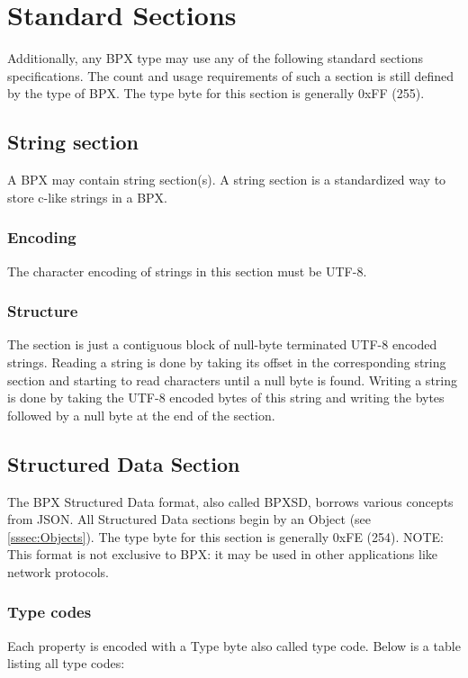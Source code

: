 \section{Standard Sections}

Additionally, any BPX type may use any of the following standard sections specifications. The count and usage requirements of such a section is still defined by the type of BPX. The type byte for this section is generally 0xFF (255).

\subsection{String section} \label{ssec:Strings}
A BPX may contain string section(s). A string section is a standardized way to store c-like strings in a BPX.

\subsubsection{Encoding}
The character encoding of strings in this section must be UTF-8.

\subsubsection{Structure}
The section is just a contiguous block of null-byte terminated UTF-8 encoded strings.\newline
Reading a string is done by taking its offset in the corresponding string section and starting to read characters until a null byte is found.\newline
Writing a string is done by taking the UTF-8 encoded bytes of this string and writing the bytes followed by a null byte at the end of the section.

\subsection{Structured Data Section} \label{ssec:Structured}
The BPX Structured Data format, also called BPXSD, borrows various concepts from JSON. All Structured Data sections begin by an Object (see \ref{sssec:Objects}). The type byte for this section is generally 0xFE (254).\newline
NOTE: This format is not exclusive to BPX: it may be used in other applications like network protocols.

\subsubsection{Type codes}
Each property is encoded with a Type byte also called type code.  Below is a table listing all type codes:

